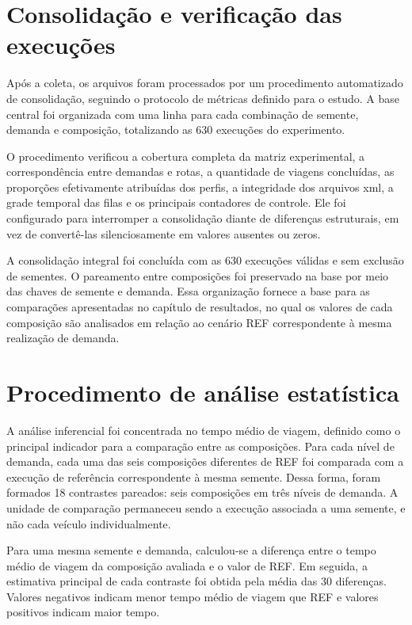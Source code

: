 \section{Consolidação e verificação das execuções}

Após a coleta, os arquivos foram processados por um procedimento automatizado de consolidação, seguindo o protocolo de métricas definido para o estudo. A base central foi organizada com uma linha para cada combinação de semente, demanda e composição, totalizando as 630 execuções do experimento.

O procedimento verificou a cobertura completa da matriz experimental, a correspondência entre demandas e rotas, a quantidade de viagens concluídas, as proporções efetivamente atribuídas dos perfis, a integridade dos arquivos \gls{xml}, a grade temporal das filas e os principais contadores de controle. Ele foi configurado para interromper a consolidação diante de diferenças estruturais, em vez de convertê-las silenciosamente em valores ausentes ou zeros.

A consolidação integral foi concluída com as 630 execuções válidas e sem exclusão de sementes. O pareamento entre composições foi preservado na base por meio das chaves de semente e demanda. Essa organização fornece a base para as comparações apresentadas no capítulo de resultados, no qual os valores de cada composição são analisados em relação ao cenário REF correspondente à mesma realização de demanda.

\section{Procedimento de análise estatística}

A análise inferencial foi concentrada no tempo médio de viagem, definido como o principal indicador para a comparação entre as composições. Para cada nível de demanda, cada uma das seis composições diferentes de REF foi comparada com a execução de referência correspondente à mesma semente. Dessa forma, foram formados 18 contrastes pareados: seis composições em três níveis de demanda. A unidade de comparação permaneceu sendo a execução associada a uma semente, e não cada veículo individualmente.

Para uma mesma semente e demanda, calculou-se a diferença entre o tempo médio de viagem da composição avaliada e o valor de REF. Em seguida, a estimativa principal de cada contraste foi obtida pela média das 30 diferenças. Valores negativos indicam menor tempo médio de viagem que REF e valores positivos indicam maior tempo.

